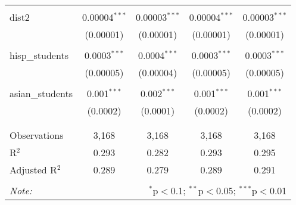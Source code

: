 \begin{table}[!htbp]
\begin{tabular}{@{\extracolsep{-2pt}}lcccc}
  & & & & \\ 
 dist2 & 0.00004$^{***}$ & 0.00003$^{***}$ & 0.00004$^{***}$ & 0.00003$^{***}$ \\ 
  & (0.00001) & (0.00001) & (0.00001) & (0.00001) \\ 
  & & & & \\ 
 hisp\_students & 0.0003$^{***}$ & 0.0004$^{***}$ & 0.0003$^{***}$ & 0.0003$^{***}$ \\ 
  & (0.00005) & (0.00004) & (0.00005) & (0.00005) \\ 
  & & & & \\ 
 asian\_students & 0.001$^{***}$ & 0.002$^{***}$ & 0.001$^{***}$ & 0.001$^{***}$ \\ 
  & (0.0002) & (0.0001) & (0.0002) & (0.0002) \\ 
  & & & & \\ 
\hline \\[-1.8ex] 
Observations & 3,168 & 3,168 & 3,168 & 3,168 \\ 
R$^{2}$ & 0.293 & 0.282 & 0.293 & 0.295 \\ 
Adjusted R$^{2}$ & 0.289 & 0.279 & 0.289 & 0.291 \\ 
\hline 
\hline \\[-1.8ex] 
\textit{Note:}  & \multicolumn{4}{r}{$^{*}$p$<$0.1; $^{**}$p$<$0.05; $^{***}$p$<$0.01} \\ 
\end{tabular} 
\end{table} 
